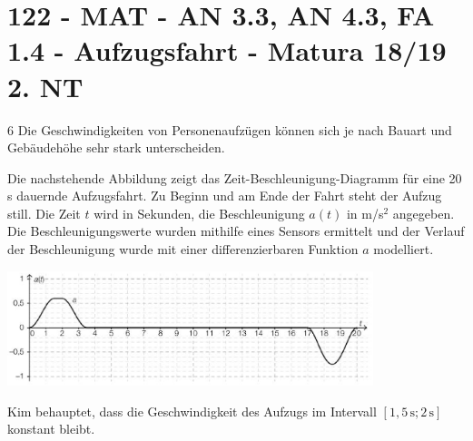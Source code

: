 \section{122 - MAT - AN 3.3, AN 4.3, FA 1.4 - Aufzugsfahrt - Matura 18/19 2. NT}

\begin{langesbeispiel} \item[6] %
Die Geschwindigkeiten von Personenaufzügen können sich je nach Bauart und Gebäudehöhe sehr stark unterscheiden.

Die nachstehende Abbildung zeigt das Zeit-Beschleunigung-Diagramm für eine 20\,s dauernde Aufzugsfahrt. Zu Beginn und am Ende der Fahrt steht der Aufzug still. Die Zeit $t$ wird in Sekunden, die Beschleunigung $a(t)$ in m/s$^2$ angegeben. Die Beschleunigungswerte wurden mithilfe eines Sensors ermittelt und der Verlauf der Beschleunigung wurde mit einer differenzierbaren Funktion $a$ modelliert.

\begin{center}
\includegraphics[width=0.8\textwidth]{../_database/Bilder/122_zug.eps}
\end{center}%

\begin{aufgabenstellung}
\item %

	
Kim behauptet, dass die Geschwindigkeit des Aufzugs im Intervall $[1,5\,\text{s}; 2\,\text{s}]$ konstant bleibt.	
	


\end{aufgabenstellung}
\end{langesbeispiel}
